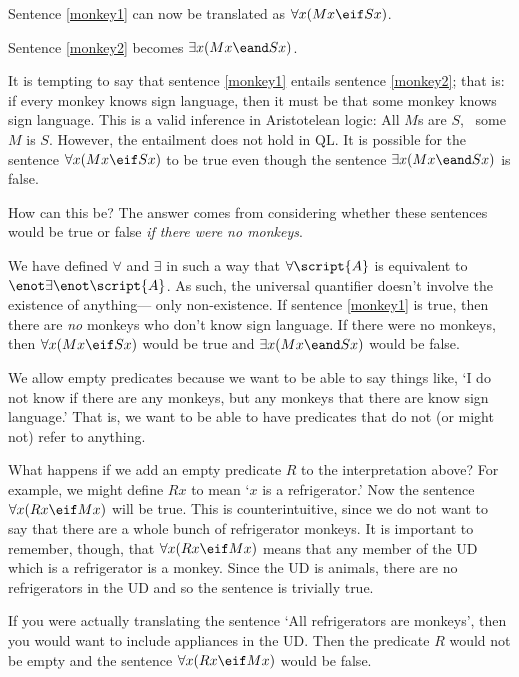 Sentence \ref{monkey1} can now be translated as $\forall x(Mx \eif Sx)$.

Sentence \ref{monkey2} becomes $\exists x(Mx \eand Sx)$.

It is tempting to say that sentence \ref{monkey1} entails sentence \ref{monkey2}; that is: if every monkey knows sign language, then it must be that some monkey knows sign language. This is a valid inference in Aristotelean logic: All $M$s are $S$, \therefore\ some $M$ is $S$. However, the entailment does not hold in QL. It is possible for the sentence $\forall x(Mx \eif Sx)$ to be true even though the sentence $\exists x(Mx \eand Sx)$ is false.

How can this be? The answer comes from considering whether these sentences would be true or false \emph{if there were no monkeys}.

We have defined $\forall$ and $\exists$ in such a way that $\forall\script{A}$ is equivalent to $\enot \exists\enot \script{A}$. As such, the universal quantifier doesn't involve the existence of anything--- only non-existence. If sentence \ref{monkey1} is true, then there are \emph{no} monkeys who don't know sign language. If there were no monkeys, then $\forall x(Mx \eif Sx)$ would be true and $\exists x(Mx \eand Sx)$ would be false.

We allow empty predicates because we want to be able to say things like, `I do not know if there are any monkeys, but any monkeys that there are know sign language.' That is, we want to be able to have predicates that do not (or might not) refer to anything.


What happens if we add an empty predicate $R$ to the interpretation above? For example, we might define $Rx$ to mean `$x$ is a refrigerator.' Now the sentence $\forall x(Rx \eif Mx)$ will be true. This is counterintuitive, since we do not want to say that there are a whole bunch of refrigerator monkeys. It is important to remember, though, that $\forall x(Rx \eif Mx)$ means that any member of the UD which is a refrigerator is a monkey. Since the UD is animals, there are no refrigerators in the UD and so the sentence is trivially true.

If you were actually translating the sentence `All refrigerators are monkeys', then you would want to include appliances in the UD. Then the predicate $R$ would not be empty and the sentence $\forall x(Rx \eif Mx)$ would be false.

